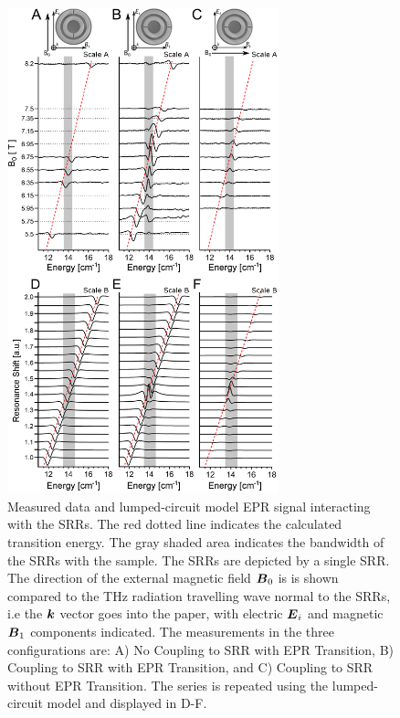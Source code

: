 \begin{figure}[htp]\centering
  \includegraphics[width=0.7\textwidth]{Kapitel/Ch3-Images/HugeData.eps}%
  \caption[FD-FT EPR Data and Lumped-Circuit Model with SRRs]{Measured data and lumped-circuit model EPR signal interacting with the SRRs. The red dotted line indicates the calculated transition energy. The gray shaded area indicates the bandwidth of the SRRs with the sample. The SRRs are depicted by a single SRR. The direction of the external magnetic field $\boldsymbol{B}_{0}$ is is shown compared to the THz radiation travelling wave normal to the SRRs, i.e the $\boldsymbol{k}$ vector goes into the paper, with electric $\boldsymbol{E}_i$ and magnetic $\boldsymbol{B}_1$ components indicated. The measurements in the three configurations are: A) No Coupling to SRR with EPR Transition, B) Coupling to SRR with EPR Transition, and C) Coupling to SRR without EPR Transition. The series is repeated using the lumped-circuit model and displayed in D-F.\label{ch3-fig:datacompare}}
\end{figure}

